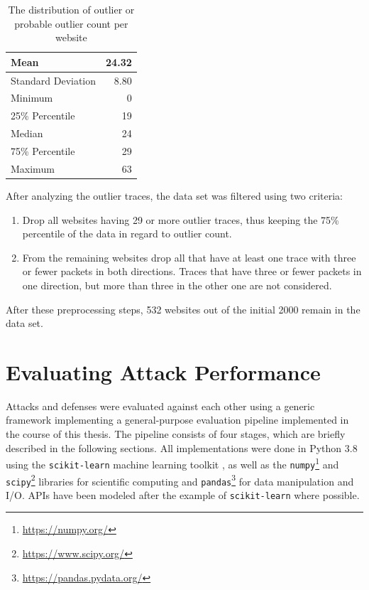 \documentclass[
	ruledheaders=chapter,
	class=report,
	thesis={type=master, department=inf},
	accentcolor=1c,
	custommargins=true,
	marginpar=false,
	parskip=half-,
	fontsize=11pt,
]{tudapub}
\begin{document}
	\begin{table}
		\centering
		\begin{tabular}{|l|r|}
			\hline Mean & 24.32 \\
			\hline Standard Deviation & 8.80 \\
			\hline Minimum & 0\\
			\hline 25\% Percentile & 19 \\
			\hline Median & 24 \\
			\hline 75\% Percentile & 29 \\
			\hline Maximum & 63\\
			\hline
		\end{tabular}
		\caption{The distribution of outlier or probable outlier count per website}
		\label{tbl:outlier_dist}
	\end{table}

	After analyzing the outlier traces, the data set was filtered using two criteria:
	
	\begin{enumerate}
		\item Drop all websites having 29 or more outlier traces, thus keeping the 75\% percentile of the data in regard to outlier count.
		\item From the remaining websites drop all that have at least one trace with three or fewer packets in both directions. Traces that have three or fewer packets in one direction, but more than three in the other one are not considered.
	\end{enumerate}

	After these preprocessing steps, 532 websites out of the initial 2000 remain in the data set.

	\section{Evaluating Attack Performance}
	\label{pipeline}
	
	Attacks and defenses were evaluated against each other using a generic framework implementing a general-purpose evaluation pipeline implemented in the course of this thesis. The pipeline consists of four stages, which are briefly described in the following sections. All implementations were done in Python 3.8 using the \texttt{scikit-learn} machine learning toolkit \cite{Pedregosa2011}, as well as the \texttt{numpy}\footnote{\url{https://numpy.org/}} \cite{Harris2020} and \texttt{scipy}\footnote{\url{https://www.scipy.org/}} \cite{Virtanen2020} libraries for scientific computing and \texttt{pandas}\footnote{\url{https://pandas.pydata.org/}} \cite{McKinney2010,Reback2021} for data manipulation and I/O. APIs have been modeled after the example of \texttt{scikit-learn} \cite{Buitinck2013} where possible.
	
\end{document}
